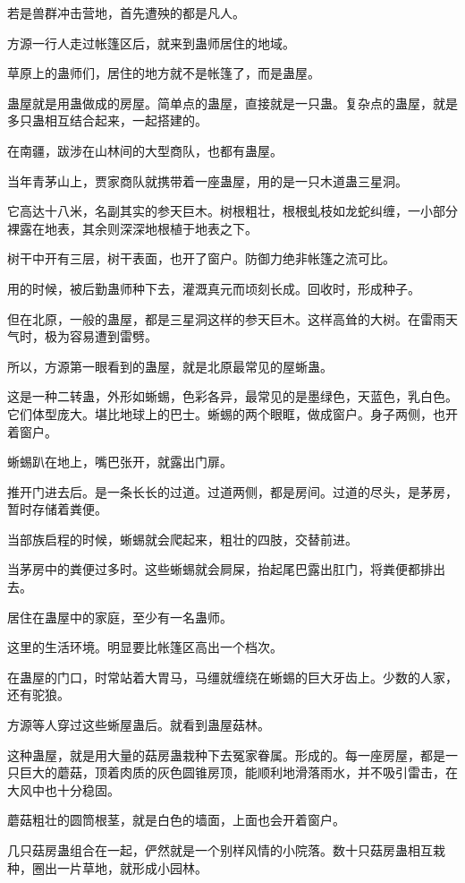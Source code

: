 \begin{this_body}
若是兽群冲击营地，首先遭殃的都是凡人。

方源一行人走过帐篷区后，就来到蛊师居住的地域。

草原上的蛊师们，居住的地方就不是帐篷了，而是蛊屋。

蛊屋就是用蛊做成的房屋。简单点的蛊屋，直接就是一只蛊。复杂点的蛊屋，就是多只蛊相互结合起来，一起搭建的。

在南疆，跋涉在山林间的大型商队，也都有蛊屋。

当年青茅山上，贾家商队就携带着一座蛊屋，用的是一只木道蛊三星洞。

它高达十八米，名副其实的参天巨木。树根粗壮，根根虬枝如龙蛇纠缠，一小部分裸露在地表，其余则深深地根植于地表之下。

树干中开有三层，树干表面，也开了窗户。防御力绝非帐篷之流可比。

用的时候，被后勤蛊师种下去，灌溉真元而顷刻长成。回收时，形成种子。

但在北原，一般的蛊屋，都是三星洞这样的参天巨木。这样高耸的大树。在雷雨天气时，极为容易遭到雷劈。

所以，方源第一眼看到的蛊屋，就是北原最常见的屋蜥蛊。

这是一种二转蛊，外形如蜥蜴，色彩各异，最常见的是墨绿色，天蓝色，乳白色。它们体型庞大。堪比地球上的巴士。蜥蜴的两个眼眶，做成窗户。身子两侧，也开着窗户。

蜥蜴趴在地上，嘴巴张开，就露出门扉。

推开门进去后。是一条长长的过道。过道两侧，都是房间。过道的尽头，是茅房，暂时存储着粪便。

当部族启程的时候，蜥蜴就会爬起来，粗壮的四肢，交替前进。

当茅房中的粪便过多时。这些蜥蜴就会屙屎，抬起尾巴露出肛门，将粪便都排出去。

居住在蛊屋中的家庭，至少有一名蛊师。

这里的生活环境。明显要比帐篷区高出一个档次。

在蛊屋的门口，时常站着大胃马，马缰就缠绕在蜥蜴的巨大牙齿上。少数的人家，还有驼狼。

方源等人穿过这些蜥屋蛊后。就看到蛊屋菇林。

这种蛊屋，就是用大量的菇房蛊栽种下去冤家眷属。形成的。每一座房屋，都是一只巨大的蘑菇，顶着肉质的灰色圆锥房顶，能顺利地滑落雨水，并不吸引雷击，在大风中也十分稳固。

蘑菇粗壮的圆筒根茎，就是白色的墙面，上面也会开着窗户。

几只菇房蛊组合在一起，俨然就是一个别样风情的小院落。数十只菇房蛊相互栽种，圈出一片草地，就形成小园林。


\end{this_body}

